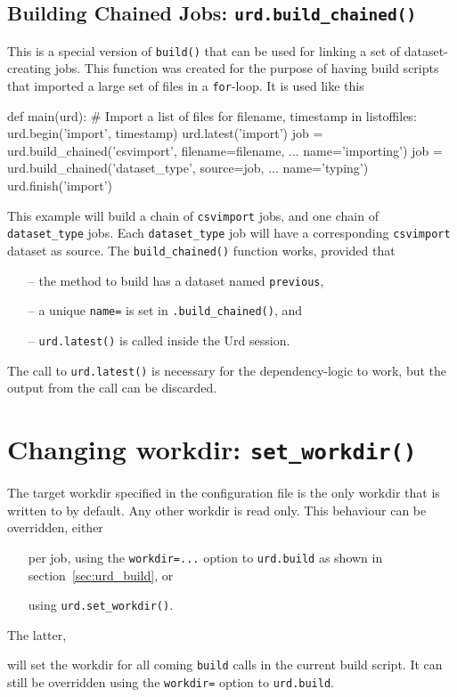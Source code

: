 \subsection{Building Chained Jobs: \texttt{urd.build\_chained()}}
This is a special version of \texttt{build()} that can be used for
linking a set of dataset-creating jobs.  This function was created for
the purpose of having build scripts that imported a large set of files
in a \texttt{for}-loop.  It is used like this
\begin{python}
def main(urd):
    # Import a list of files
    for filename, timestamp in listoffiles:
        urd.begin('import', timestamp)
        urd.latest('import')
        job = urd.build_chained('csvimport',
                                filename=filename,
                                ...
                                name='importing')
        job = urd.build_chained('dataset_type',
                                source=job,
                                ...
                                name='typing')
        urd.finish('import')
\end{python}
This example will build a chain of \texttt{csvimport} jobs, and one
chain of \texttt{dataset\_type} jobs.  Each \texttt{dataset\_type} job
will have a corresponding \texttt{csvimport} dataset as source.
The \texttt{build\_chained()} function works, provided that
\begin{itemize}
\item[--] the method to build has a dataset named \texttt{previous},
\item[--] a unique \texttt{name=} is set in \texttt{.build\_chained()}, and
\item[--] \texttt{urd.latest()} is called inside the Urd session.
\end{itemize}
The call to \texttt{urd.latest()} is necessary for the
dependency-logic to work, but the output from the call can be
discarded.



\section{Changing workdir:  \texttt{set\_workdir()}}
\label{sec:set_workdir}
The target workdir specified in the configuration file is the only
workdir that is written to by default.  Any other workdir is read
only.  This behaviour can be overridden, either
\begin{itemize}
\item[] per job, using the \texttt{workdir=...} option to \texttt{urd.build} as shown in section~\ref{sec:urd_build}, or
\item[] using \texttt{urd.set\_workdir()}.
\end{itemize}
The latter,
\begin{python}
def main(urd):
    urd.set_workdir(<workdir>)}
\end{python}
will set the workdir for all coming \texttt{build} calls in the
current build script.  It can still be overridden using
the \texttt{workdir=} option to \texttt{urd.build}.




